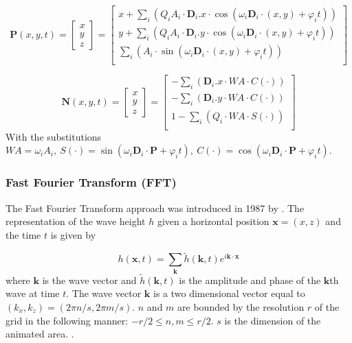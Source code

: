 \begin{equation}\label{eq:gerstner_position}
    \textbf{P}(x,y,t)=\begin{bmatrix}x\\ y\\ z\end{bmatrix}=\begin{bmatrix} x +
    \sum_{i}(Q_i A_i\cdot\textbf{D}_i.x\cdot \cos(\omega_i \textbf{D}_i\cdot
    (x,y) + \varphi_i t))\\ y + \sum_{i}(Q_i A_i\cdot\textbf{D}_i.y\cdot
    \cos(\omega_i \textbf{D}_i\cdot (x,y) + \varphi_i t))\\ \sum_{i}(A_i\cdot
\sin(\omega_i \textbf{D}_i\cdot (x,y) + \varphi_i t))\\\end{bmatrix}
\end{equation}

\begin{equation}\label{eq:gerstner_normal}
    \textbf{N}(x,y,t)=\begin{bmatrix}x\\ y\\ z\end{bmatrix}=\begin{bmatrix}
    - \sum_{i}(\textbf{D}_i.x\cdot WA \cdot C(\cdot))\\ 
    - \sum_{i}(\textbf{D}_i.y\cdot WA \cdot C(\cdot))\\ 
    1-\sum_{i}(Q_i \cdot WA \cdot S(\cdot))\\\end{bmatrix}
\end{equation}
%
With the substitutions $WA = \omega_i A_i,\ S(\cdot) = \sin(\omega_i
\textbf{D}_i \cdot \textbf{P} + \varphi_i t),\ C(\cdot) = \cos(\omega_i
\textbf{D}_i \cdot \textbf{P} + \varphi_i t)$.


\subsubsection{Fast Fourier Transform (FFT)}\label{subsub:fft}


The Fast Fourier Transform approach was introduced in 1987 by
\citeauthor{mastin1987fourier} \autocite{mastin1987fourier}. The representation
of the wave height $h$ given a horizontal position $\textbf{x} = (x,z)$ and the
time $t$ is given by

\begin{equation}
    h(\textbf{x}, t) = \sum_{\textbf{k}}^{} \tilde{h}(\textbf{k},
    t)e^{i\textbf{k}\cdot\textbf{x}}
\end{equation}
%
where $\textbf{k}$ is the wave vector and $\tilde{h}(\textbf{k}, t)$ is the
amplitude and phase of the $\textbf{k}$th wave at time $t$. The wave vector
$\textbf{k}$ is a two dimensional vector equal to $(k_x, k_z) = (2\pi n/s, 2\pi
m / s)$. $n$ and $m$ are bounded by the resolution $r$ of the grid in the
following manner: $-r/2 \leq n,m \leq r/2$. $s$ is the dimension of the animated
area.  \autocite{jensen2001deep,darles2011survey}.

